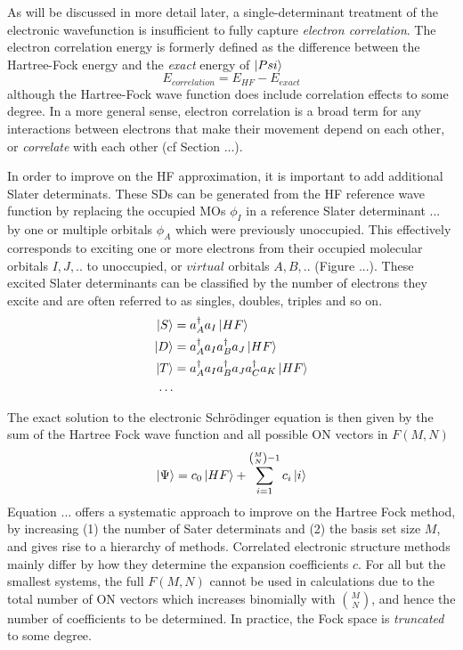 As will be discussed in more detail later, a single-determinant treatment of the electronic wavefunction is insufficient to fully capture \emph{electron correlation}. The electron correlation energy is formerly defined as the difference between the Hartree-Fock energy and the \emph{exact} energy of $\ket{Psi}$
\begin{equation}
E_{correlation} = E_{HF} - E_{exact}
\end{equation}
\noindent although the Hartree-Fock wave function does include correlation effects to some degree. In a more general sense, electron correlation is a broad term for any interactions between electrons that make their movement depend on each other, or \emph{correlate} with each other (cf Section ...). 

In order to improve on the HF approximation, it is important to add additional Slater determinats. These SDs can be generated from the HF reference wave function by replacing the occupied MOs $\phi_I$ in a reference Slater determinant ... by one or multiple orbitals $\phi_A$ which were previously unoccupied. This effectively corresponds to exciting one or more electrons from their occupied molecular orbitals $I,J,..$ to unoccupied, or $virtual$ orbitals $A,B,..$ (Figure ...). These excited Slater determinants can be classified by the number of electrons they excite and are often referred to as singles, doubles, triples and so on.
\begin{align*}
\ket{S} &= a^{\dagger}_A a_I \ket{HF} \\
\ket{D} &= a^{\dagger}_A a_I a^{\dagger}_B a_J \ket{HF} \\
\ket{T} &= a^{\dagger}_A a_I a^{\dagger}_B a_J a^{\dagger}_C a_K \ket{HF} \\
\ldots &
\end{align*}

The exact solution to the electronic Schrödinger equation is then given by the sum of the Hartree Fock wave function and all possible ON vectors in $F(M,N)$
\begin{equation}
\ket{\Psi} = c_0 \ket{HF} + \sum^{{{M}\choose{N}}-1}_{i=1} c_i  \ket{i} 
\end{equation}  
\noindent Equation ... offers a systematic approach to improve on the Hartree Fock method, by increasing (1) the number of Sater determinats and (2) the basis set size $M$, and gives rise to a hierarchy of methods. Correlated electronic structure methods mainly differ by how they determine the expansion coefficients $c$. For all but the smallest systems, the full $F(M,N)$ cannot be used in calculations due to the total number of ON vectors which increases binomially with ${M}\choose{N}$, and hence the number of coefficients to be determined. In practice, the Fock space is \emph{truncated} to some degree.

